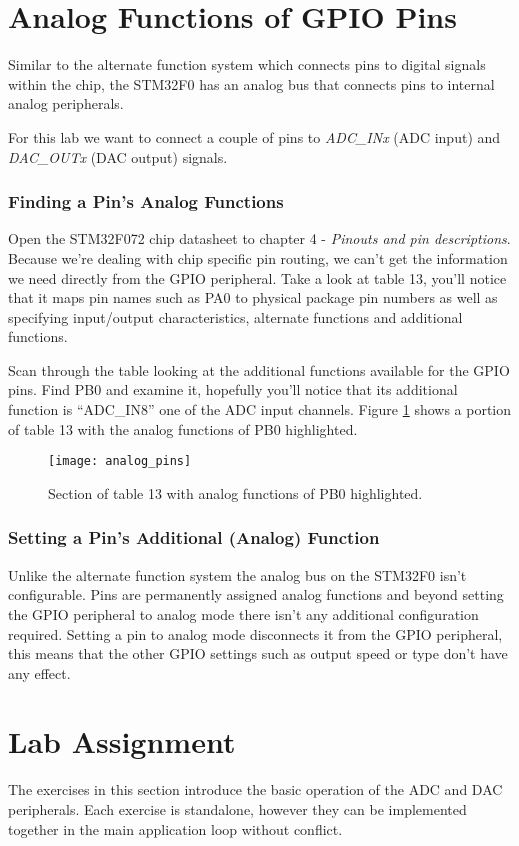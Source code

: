 \documentclass[11pt,fleqn]{book} %
\begin{document}
\section{Analog Functions of GPIO Pins}
Similar to the alternate function system which connects pins to digital signals within the chip, the STM32F0 has an analog bus that connects pins to internal analog peripherals. 

For this lab we want to connect a couple of pins to \textit{ADC\_INx} (ADC input) and \textit{DAC\_OUTx} (DAC output) signals. 

\subsubsection{Finding a Pin's Analog Functions}
Open the STM32F072 chip datasheet to chapter 4 - \textit{Pinouts and pin descriptions}. Because we're dealing with chip specific pin routing, we can't get the information we need directly from the GPIO peripheral. Take a look at table 13, you'll notice that it maps pin names such as PA0 to physical package pin numbers as well as specifying input/output characteristics, alternate functions and additional functions.

Scan through the table looking at the additional functions available for the GPIO pins. Find PB0 and examine it, hopefully you'll notice that its additional function is ``ADC\_IN8'' one of the ADC input channels. Figure \ref{analog_pins} shows a portion of table 13 with the analog functions of PB0 highlighted.

\begin{figure}[]
    \centering\texttt{[image: analog\_pins]}
    \caption{Section of table 13 with analog functions of PB0 highlighted.}
    \label{analog_pins}
\end{figure}

\subsubsection{Setting a Pin's Additional (Analog) Function}
Unlike the alternate function system the analog bus on the STM32F0 isn't configurable. Pins are permanently assigned analog functions and beyond setting the GPIO peripheral to analog mode there isn't any additional configuration required. Setting a pin to analog mode disconnects it from the GPIO peripheral, this means that the other GPIO settings such as output speed or type don't have any effect.

\section{Lab Assignment}
The exercises in this section introduce the basic operation of the ADC and DAC peripherals. Each exercise is standalone, however they can be implemented together in the main application loop without conflict. 
\end{document}
